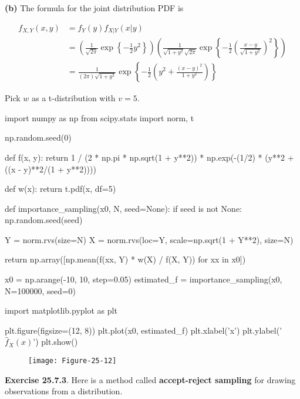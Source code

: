 \textbf{(b)} The formula for the joint distribution PDF is

\begin{align*}
f_{X, Y}(x, y) &= f_Y(y) f_{X | Y}(x | y) \\
&= \left( \frac{1}{\sqrt{2 \pi}} \exp \left\{ -\frac{1}{2} y^{2} \right\} \right)
\left( \frac{1}{\sqrt{1 + y^{2}} \sqrt{2 \pi}} \exp \left\{ -\frac{1}{2} \left( \frac{x - y}{\sqrt{1 + y^{2}}} \right)^{2}\right\} \right) \\
&= \frac{1}{(2 \pi) \sqrt{1 + y^{2}}} \exp \left\{ -\frac{1}{2} \left( y^{2} + \frac{(x - y)^{2}}{1 + y^{2}} \right) \right\}
\end{align*}

Pick \(w\) as a t-distribution with \(v = 5\).

\begin{python}
import numpy as np
from scipy.stats import norm, t

np.random.seed(0)

def f(x, y):
    return 1 / (2 * np.pi * np.sqrt(1 + y**2)) * np.exp(-(1/2) * (y**2 + ((x - y)**2/(1 + y**2))))

def w(x):
    return t.pdf(x, df=5)

def importance_sampling(x0, N, seed=None):
    if seed is not None:
        np.random.seed(seed)
        
    Y = norm.rvs(size=N)
    X = norm.rvs(loc=Y, scale=np.sqrt(1 + Y**2), size=N)
    
    return np.array([np.mean(f(xx, Y) * w(X) / f(X, Y)) for xx in x0])
\end{python}

\begin{python}
x0 = np.arange(-10, 10, step=0.05)
estimated_f = importance_sampling(x0, N=100000, seed=0)
\end{python}

\begin{python}
import matplotlib.pyplot as plt

plt.figure(figsize=(12, 8))
plt.plot(x0, estimated_f)
plt.xlabel('x')
plt.ylabel('$\hat{f}_X(x)$')
plt.show()
\end{python}

\begin{figure}[H]
\centering
\texttt{[image: Figure-25-12]}
\end{figure}

\textbf{Exercise 25.7.3}. Here is a method called \textbf{accept-reject
sampling} for drawing observations from a distribution.

